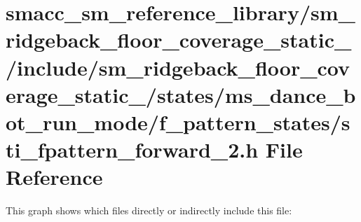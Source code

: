 \hypertarget{sm__ridgeback__floor__coverage__static__1_2include_2sm__ridgeback__floor__coverage__static__1_2saa5db0753488cdebfea8c258220137f8}{}\section{smacc\+\_\+sm\+\_\+reference\+\_\+library/sm\+\_\+ridgeback\+\_\+floor\+\_\+coverage\+\_\+static\+\_/include/sm\+\_\+ridgeback\+\_\+floor\+\_\+coverage\+\_\+static\+\_/states/ms\+\_\+dance\+\_\+bot\+\_\+run\+\_\+mode/f\+\_\+pattern\+\_\+states/sti\+\_\+fpattern\+\_\+forward\+\_\+2.h File Reference}
\label{sm__ridgeback__floor__coverage__static__1_2include_2sm__ridgeback__floor__coverage__static__1_2saa5db0753488cdebfea8c258220137f8}
This graph shows which files directly or indirectly include this file\+:
\nopagebreak
